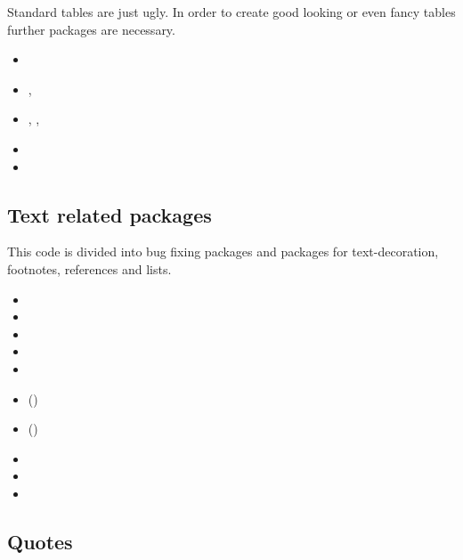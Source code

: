 Standard \latex tables are just ugly. In order to create good looking or even fancy tables further packages are necessary.

\begin{itemize}[noitemsep]
\item {}
\item {}, 
\item {}, , 
\item {}
\item {}
\end{itemize}
 

\subsection{Text related packages}
\label{sec:packages:text}

This code is divided into bug fixing packages and packages for text-decoration, footnotes, references and lists.

\begin{itemize}[noitemsep]
\item {}
\item {}
\item {}
\item {}
\item {}
\item ()
\item ()
\item {}
\item {}
\item {}
\end{itemize}


\subsection{Quotes}
\label{sec:packages:quotes}

